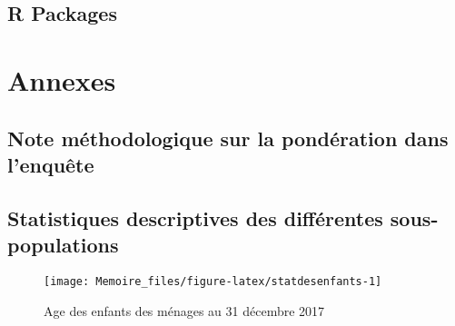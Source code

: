 \documentclass[
  12pt,
]{book}
\begin{document}
\section{R Packages}\label{r-packages}

\chapter{Annexes}\label{annexes}

\section{Note méthodologique sur la pondération dans
l'enquête}\label{note-muxe9thodologique-sur-la-ponduxe9ration-dans-lenquuxeate}

\section{Statistiques descriptives des différentes
sous-populations}\label{statistiques-descriptives-des-diffuxe9rentes-sous-populations}

\begin{figure}[h]

{\centering \texttt{[image: Memoire\_files/figure-latex/statdesenfants-1]} 

}

\caption{Age des enfants des ménages au 31 décembre 2017}\label{fig:statdesenfants}
\end{figure}
\end{document}
